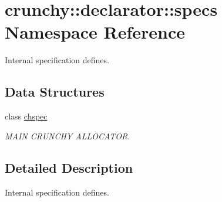 \hypertarget{namespacecrunchy_1_1declarator_1_1specs}{}\section{crunchy\+:\+:declarator\+:\+:specs Namespace Reference}
\label{namespacecrunchy_1_1declarator_1_1specs}


Internal specification defines.  


\subsection*{Data Structures}
\begin{DoxyCompactItemize}
\item 
class \hyperlink{classcrunchy_1_1declarator_1_1specs_1_1chspec}{chspec}
\begin{DoxyCompactList}\small\item\em M\+A\+I\+N C\+R\+U\+N\+C\+H\+Y A\+L\+L\+O\+C\+A\+T\+O\+R. \end{DoxyCompactList}\end{DoxyCompactItemize}


\subsection{Detailed Description}
Internal specification defines. 